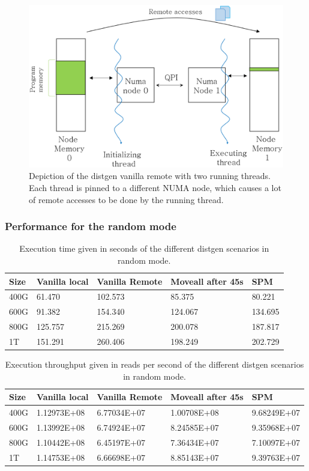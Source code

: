 \begin{figure}
	\centering
		\includegraphics[width=.7\textwidth]{figures/distgentt-remote.eps}
		\caption[Depiction of the working of the distgen vanilla remote scenario with two threads]{Depiction of the distgen vanilla remote with two running threads. Each thread is pinned to a different NUMA node, which causes a lot of remote accesses to be done by the running thread.}
		\label{fig:dgentt-remote}
\end{figure}
\FloatBarrier
\subsubsection{Performance for the random mode}\label{subsection:res-dgrandom-2t-scens}

\begin{table}
	\centering
		\begin{tabularx}{\textwidth}{|l|l|l|l|X|}
		\hline
			Size & Vanilla local & Vanilla Remote & Moveall after 45s & SPM \\
			\hline
			400G & 61.470 & 102.573 & 85.375 & 80.221\\
			\hline
			600G & 91.382 & 154.340 & 124.067 & 134.695\\
			\hline
			800G & 125.757 & 215.269 & 200.078 & 187.817\\
			\hline
			1T & 151.291 & 260.406 & 198.249 & 202.729\\
			\hline
		\end{tabularx}
		\caption{Execution time given in seconds of the different distgen scenarios in random mode.}
		\label{table:res-dgentimrdm2t}
\end{table}

\begin{table}
	\centering
		\begin{tabularx}{\textwidth}{|l|l|l|l|X|}
		\hline
			Size & Vanilla local & Vanilla Remote & Moveall after 45s & SPM \\
			\hline
			400G & 1.12973E+08 & 6.77034E+07 & 1.00708E+08 & 9.68249E+07\\
			\hline
			600G & 1.13992E+08 & 6.74924E+07 & 8.24585E+07 & 9.35968E+07\\
			\hline
			800G & 1.10442E+08 & 6.45197E+07 & 7.36434E+07 & 7.10097E+07\\
			\hline
			1T & 1.14753E+08 & 6.66698E+07 & 8.85143E+07 & 9.39763E+07\\
			\hline
		\end{tabularx}
		\caption{Execution throughput given in reads per second of the different distgen scenarios in random mode.}
		\label{table:res-dgentrgrdm2t}
\end{table}

